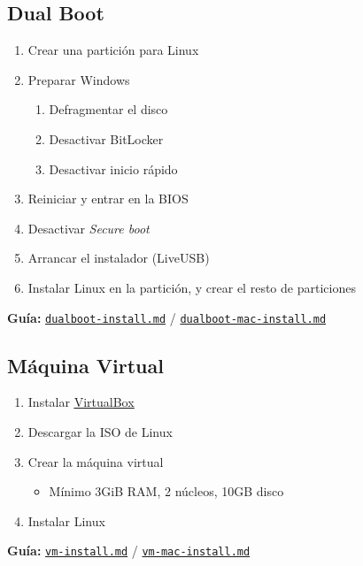 \documentclass[aspectratio=43]{beamer}
\begin{document}
    \subsection{Dual Boot}
     \begin{frame}[fragile]{\subsecname}{}
        \begin{enumerate}
            \item Crear una partición para Linux
            \item Preparar Windows
            \begin{enumerate}
                \item Defragmentar el disco
                \item Desactivar BitLocker
                \item Desactivar inicio rápido
            \end{enumerate}
            \item Reiniciar y entrar en la BIOS
            \item Desactivar \textit{Secure boot}
            \item Arrancar el instalador (LiveUSB)
            \item Instalar Linux en la partición, y crear el resto de particiones
        \end{enumerate}
        \bigskip
        \textbf{Guía:} \href{https://github.com/guluc3m/linux404/blob/main/dualboot-install.md}{\underline{}\texttt{dualboot-install.md}} / \href{https://github.com/guluc3m/linux404/blob/main/dualboot-mac-install.md}{\underline{}\texttt{dualboot-mac-install.md}}
    \end{frame}

    \subsection{Máquina Virtual}
    \begin{frame}[fragile]{\subsecname}{}
        \begin{enumerate}
            \item Instalar \href{https://www.virtualbox.org/}{\underline{VirtualBox}}
            \item Descargar la ISO de Linux
            \item Crear la máquina virtual
            \begin{itemize}
                \item Mínimo 3GiB RAM, 2 núcleos, 10GB disco
            \end{itemize}
            \item Instalar Linux
        \end{enumerate}
        \bigskip
        \textbf{Guía:} \href{https://github.com/guluc3m/linux404/blob/main/vm-install.md}{\underline{}\texttt{vm-install.md}} / \href{https://github.com/guluc3m/linux404/blob/main/vm-mac-install.md}{\underline{}\texttt{vm-mac-install.md}}
    \end{frame}
\end{document}
